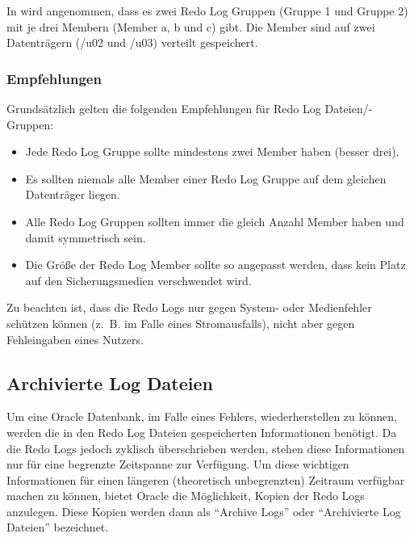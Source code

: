             In  wird angenommen, dass es zwei Redo Log Gruppen (Gruppe 1 und Gruppe 2) mit je drei Membern (Member a, b und c) gibt. Die Member sind auf zwei Datentr\"agern (/u02 und /u03) verteilt gespeichert.


          \subsubsection{Empfehlungen}
            Grunds\"atzlich gelten die folgenden Empfehlungen f\"ur Redo Log Dateien/-Gruppen:
            \begin{itemize}
              \item Jede Redo Log Gruppe sollte mindestens zwei Member haben (besser drei).
              \item Es sollten niemals alle Member einer Redo Log Gruppe auf dem gleichen Datentr\"ager liegen.
              \item Alle Redo Log Gruppen sollten immer die gleich Anzahl Member haben und damit symmetrisch sein.
              \item Die Gr\"o\ss{}e der Redo Log Member sollte so angepasst werden, dass kein Platz auf den Sicherungsmedien verschwendet wird.
            \end{itemize}
\clearpage
            \begin{merke}
              Zu beachten ist, dass die Redo Logs nur gegen System- oder Medienfehler sch\"utzen k\"onnen (z.~B. im Falle eines Stromausfalls), nicht aber gegen Fehleingaben eines Nutzers.
            \end{merke}
        \subsection{Archivierte Log Dateien}
          Um eine Oracle Datenbank, im Falle eines Fehlers, wiederherstellen zu k\"onnen, werden die in den Redo Log Dateien gespeicherten Informationen ben\"otigt. Da die Redo Logs jedoch zyklisch \"uberschrieben werden, stehen diese Informationen nur f\"ur eine begrenzte Zeitspanne zur Verf\"ugung. Um diese wichtigen Informationen f\"ur einen l\"angeren (theoretisch unbegrenzten) Zeitraum verf\"ugbar machen zu k\"onnen, bietet Oracle die M\"oglichkeit, Kopien der Redo Logs anzulegen. Diese Kopien werden dann als \enquote{Archive Logs} oder \enquote{Archivierte Log Dateien} bezeichnet.
